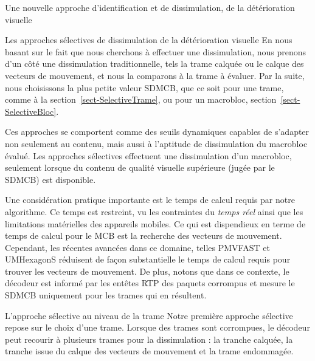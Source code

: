 \begin{chapter}{Une nouvelle approche d'identification et de dissimulation, de
la détérioration visuelle}
\begin{section}{Les approches sélectives de dissimulation de la détérioration
visuelle}
En nous basant sur le fait que nous cherchons à effectuer une dissimulation,
nous prenons d'un côté une dissimulation traditionnelle, tels la trame calquée
ou le calque des vecteurs de mouvement, et nous la comparons à la trame à
évaluer. Par la suite, nous choisissons la plus petite valeur SDMCB, que ce soit
pour une trame, comme à la section~\ref{sect-SelectiveTrame}, ou pour un
macrobloc, section~\ref{sect-SelectiveBloc}.

Ces approches se comportent comme des seuils dynamiques capables de s'adapter
non seulement au contenu, mais aussi à l'aptitude de dissimulation du macrobloc
évalué. Les approches sélectives effectuent une dissimulation d'un macrobloc,
seulement lorsque du contenu de qualité visuelle supérieure (jugée par le SDMCB)
est disponible.

Une considération pratique importante est le temps de calcul requis par notre
algorithme. Ce temps est restreint, vu les contraintes du \textit{temps réel}
ainsi que les limitations matérielles des appareils mobiles. Ce qui est
dispendieux en terme de temps de calcul pour le MCB est la recherche des
vecteurs de mouvement. Cependant, les récentes avancées dans ce domaine, telles
PMVFAST \citep{Tourapis2001} et UMHexagonS \citep{Cai2009} réduisent de façon
substantielle le temps de calcul requis pour trouver les vecteurs de mouvement.
De plus, notons que dans ce contexte, le décodeur est informé par les entêtes
RTP des paquets corrompus et mesure le SDMCB uniquement pour les trames qui en
résultent.

\begin{subsection}{L'approche sélective au niveau de la trame}
\label{sect-SelectiveTrame}
Notre première approche sélective repose sur le choix d'une trame. Lorsque des
trames sont corrompues, le décodeur peut recourir à plusieurs trames pour la
dissimulation : la tranche calquée, la tranche issue du calque des vecteurs de
mouvement et la trame endommagée. 


\end{subsection}
\end{section}
\end{chapter}
